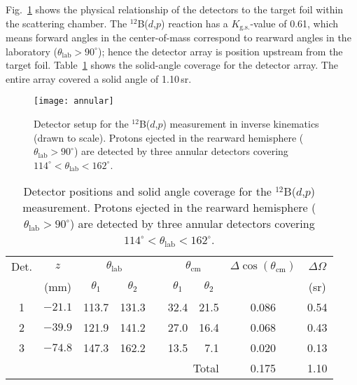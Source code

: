 Fig.~\ref{annular_dets} shows the physical relationship of the detectors to the target foil within the scattering chamber.  The  $^{12}$B($d$,$p$) reaction has a $K_\mathrm{g.s.}$-value of 0.61, which means forward angles in the center-of-mass correspond to rearward angles in the laboratory ($\theta_\mathrm{lab}>90^\circ$); hence the detector array is position upstream from the target foil.  Table~\ref{coverage} shows the solid-angle coverage for the detector array.  The entire array covered a solid angle of 1.10\,sr.

\begin{figure}%
\centering
\texttt{[image: annular]}%
\caption[Detector setup for the $^{12}$B($d$,$p$) measurement in inverse kinematics]{Detector setup for the $^{12}$B($d$,$p$) measurement in inverse kinematics (drawn to scale).  Protons ejected in the rearward hemisphere ($\theta_\mathrm{lab}>90^\circ$) are detected by three annular detectors covering $114^\circ<\theta_\mathrm{lab}<162^\circ$.  }%
\label{annular_dets}%
\end{figure}

\begin{table}%
\centering
\begin{tabular}{ccrrcrrcc}
\hline
Det.&$z$&\multicolumn{2}{c}{$\theta_\mathrm{lab}$}&&\multicolumn{2}{c}{$\theta_\mathrm{cm}$}&$\Delta \cos(\theta_\mathrm{cm})$&$\Delta \Omega$\\ \cline{3-4} \cline{6-7}
&(mm)&\multicolumn{1}{c}{$\theta_1$}&\multicolumn{1}{c}{$\theta_2$}&&\multicolumn{1}{c}{$\theta_1$}&\multicolumn{1}{c}{$\theta_2$}&&(sr)\\
\hline \hline
1&$-21.1$&113.7&131.3&&32.4 &21.5 & 0.086  & 0.54\\
2&$-39.9$&121.9&141.2&&27.0 &16.4 & 0.068  & 0.43\\
3&$-74.8$&147.3&162.2&&13.5 &7.1 & 0.020  & 0.13\\
  \multicolumn{7}{r}{Total} &0.175&1.10\\
 \hline
\end{tabular}
\caption[Detector positions and solid angle coverage for the $^{12}$B($d$,$p$) measurement]{Detector positions and solid angle coverage for the $^{12}$B($d$,$p$) measurement.  Protons ejected in the rearward hemisphere ($\theta_\mathrm{lab}>90^\circ$) are detected by three annular detectors covering $114^\circ<\theta_\mathrm{lab}<162^\circ$.  }
\label{coverage}
\end{table}


